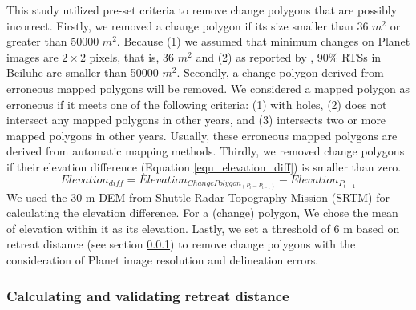 \documentclass[authoryear,preprint,review,12pt]{elsarticle}
\begin{document}
This study utilized pre-set criteria to remove change polygons that are possibly incorrect. 
Firstly, we removed a change polygon if its size smaller than 36 $m^2$ or greater than 50000 $m^2$. 
Because (1) we assumed that minimum changes on Planet images are $2\times2$ pixels, that is, 36 $m^2$ and (2) as reported by \cite{huang2020using}, 90\% RTSs in Beiluhe are smaller than 50000 $m^2$. 
Secondly, a change polygon derived from erroneous mapped polygons will be removed.
We considered a mapped polygon as erroneous if it meets one of the following criteria: (1) with holes, (2) does not intersect any mapped polygons in other years, and (3) intersects two or more mapped polygons in other years.
Usually, these erroneous mapped polygons are derived from automatic mapping methods. 
Thirdly, we removed change polygons if their elevation difference (Equation \ref{equ_elevation_diff}) is smaller than zero. 
\begin{equation}
Elevation_{diff}=Elevation_{ChangePolygon_{(P_{t}-P_{t-1})}} -  Elevation_{P_{t-1}}
\label{equ_elevation_diff}
\end{equation}
We used the 30 m DEM from Shuttle Radar Topography Mission (SRTM) \citep{farr2007shuttle} for calculating the elevation difference. 
For a (change) polygon, We chose the mean of elevation within it as its elevation. 
Lastly, we set a threshold of 6 m based on retreat distance (see section \ref{sec_cal_retreat_dis}) to remove change polygons with the consideration of Planet image resolution and delineation errors. 


\subsubsection{Calculating and validating retreat distance}
\label{sec_cal_retreat_dis}
\end{document}
